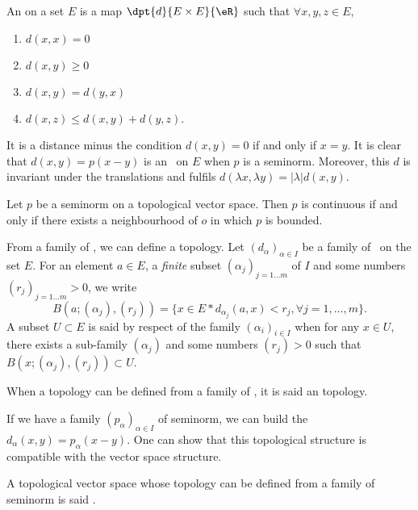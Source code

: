 \begin{definition}
An  on a set $E$ is a map $\dpt{d}{E\times E}{\eR}$ such that $\forall x,y,z\in E$,
\begin{enumerate}
\item $d(x,x)=0$
\item $d(x,y)\geq 0$
\item $d(x,y)=d(y,x)$
\item $d(x,z)\leq d(x,y)+d(y,z)$.
\end{enumerate}
\end{definition}
It is a distance minus the condition  $d(x,y)=0$ if and only if $x=y$.
It is clear that $d(x,y)=p(x-y)$ is an \ecart\ on $E$ when $p$ is a seminorm. Moreover, this $d$ is invariant under the translations and fulfils $d(\lambda x,\lambda y)=|\lambda|d(x,y)$.

\begin{proposition}
Let $p$ be a seminorm on a topological vector space. Then $p$ is continuous if and only if there exists a neighbourhood of $o$ in which $p$ is bounded.
\label{prop:semi_norm_cont}
\end{proposition}


From a family of \ecarts, we can define a topology. Let $(d_{\alpha})_{\alpha\in I}$ be a family of \ecarts\ on the set $E$. For an element $a\in E$, a \emph{finite} subset $(\alpha_j)_{j=1\ldots m}$ of $I$ and some numbers $(r_j)_{j=1\ldots m}>0$, we write
\[
  B(a; (\alpha_j),(r_j))=\{x\in E\ast d_{\alpha_j}(a,x)<r_j,\forall j=1,\ldots,m\}.
\]
\label{topo_semi_norm} A subset $U\subset E$ is said  by respect of the family $(\alpha_i)_{i\in I}$ when for any $x\in U$, there exists a sub-family $(\alpha_j)$ and some numbers $(r_j)>0$ such that $B(x;(\alpha_j),(r_j))\subset U$.

\begin{definition}
When a topology can be defined from a family of \ecarts, it is said an  topology.
\end{definition}

If we have a family $(p_{\alpha})_{\alpha\in I}$ of seminorm, we can build the \ecarts\ $d_{\alpha}(x,y)=p_{\alpha}(x-y)$. One can show that this topological structure is compatible with the vector space structure.

\begin{definition}
 A topological vector space whose topology can be defined from a family of seminorm is said .
\end{definition}

